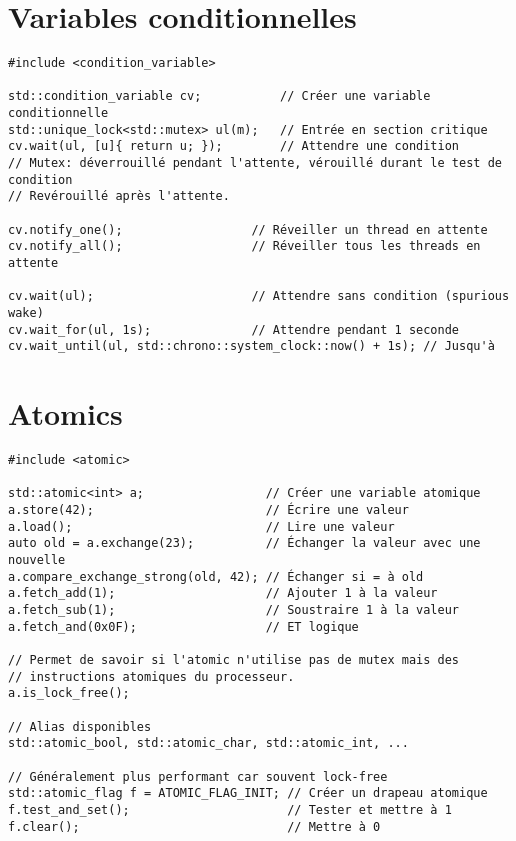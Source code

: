 \documentclass{article}
\begin{document}
\begin{multicols*}{3}
\section*{Variables conditionnelles}

\begin{lstlisting}
#include <condition_variable>

std::condition_variable cv;           // Créer une variable conditionnelle
std::unique_lock<std::mutex> ul(m);   // Entrée en section critique
cv.wait(ul, [u]{ return u; });        // Attendre une condition
// Mutex: déverrouillé pendant l'attente, vérouillé durant le test de condition
// Revérouillé après l'attente.

cv.notify_one();                  // Réveiller un thread en attente
cv.notify_all();                  // Réveiller tous les threads en attente

cv.wait(ul);                      // Attendre sans condition (spurious wake)
cv.wait_for(ul, 1s);              // Attendre pendant 1 seconde
cv.wait_until(ul, std::chrono::system_clock::now() + 1s); // Jusqu'à
\end{lstlisting}

\section*{Atomics}

\begin{lstlisting}
#include <atomic>

std::atomic<int> a;                 // Créer une variable atomique
a.store(42);                        // Écrire une valeur
a.load();                           // Lire une valeur
auto old = a.exchange(23);          // Échanger la valeur avec une nouvelle
a.compare_exchange_strong(old, 42); // Échanger si = à old
a.fetch_add(1);                     // Ajouter 1 à la valeur
a.fetch_sub(1);                     // Soustraire 1 à la valeur
a.fetch_and(0x0F);                  // ET logique

// Permet de savoir si l'atomic n'utilise pas de mutex mais des
// instructions atomiques du processeur.
a.is_lock_free();

// Alias disponibles
std::atomic_bool, std::atomic_char, std::atomic_int, ...

// Généralement plus performant car souvent lock-free
std::atomic_flag f = ATOMIC_FLAG_INIT; // Créer un drapeau atomique
f.test_and_set();                      // Tester et mettre à 1
f.clear();                             // Mettre à 0
\end{lstlisting}

\end{multicols*}
\end{document}
